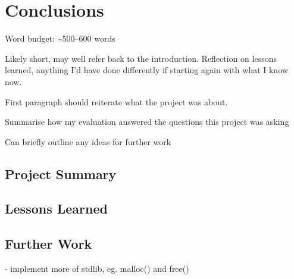 \documentclass[00-main.tex]{subfiles}
\begin{document}
\chapter{Conclusions}

\begin{Comment}
Word budget: \textasciitilde 500--600 words
\end{Comment}

\begin{Comment}
Likely short, may well refer back to the introduction. Reflection on lessons learned, anything I'd have done differently if starting again with what I know now.

First paragraph should reiterate what the project was about.

Summarise how my evaluation answered the questions this project was asking

Can briefly outline any ideas for further work
\end{Comment}

\section{Project Summary}

\section{Lessons Learned}

\section{Further Work}

\begin{Comment}
- implement more of stdlib, eg. malloc() and free()
\end{Comment}
\end{document}
